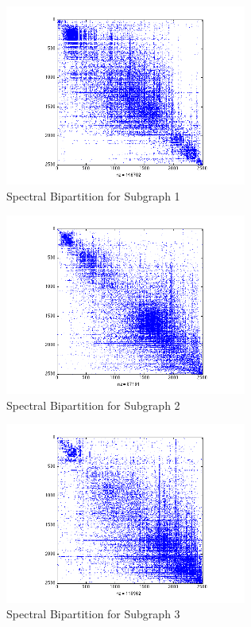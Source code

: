 \documentclass[11pt]{article}
\begin{document}
		 \begin{figure}
		 		\begin{center}
		  		\includegraphics[width=300px]{spectral_partition_a1.png}
		  	\end{center}
		  	\caption{Spectral Bipartition for Subgraph 1}
		  	\label{fig:sb1}
		 \end{figure}
		 
		 \begin{figure}
		 		\begin{center}
		  		\includegraphics[width=300px]{spectral_partition_a2.png}
		  	\end{center}
		  	\caption{Spectral Bipartition for Subgraph 2}
		  	\label{fig:sb2}
		 \end{figure}
		 
		 \begin{figure}
		 		\begin{center}
		  		\includegraphics[width=300px]{spectral_partition_a3.png}
		  	\end{center}
		  	\caption{Spectral Bipartition for Subgraph 3}
		  	\label{fig:sb3}
		 \end{figure}
		 
\end{document}
